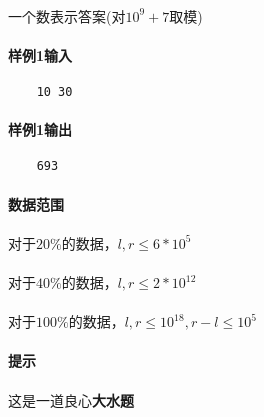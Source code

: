 \documentclass[UTF8]{ctexart}
\begin{document}
\paragraph{}一个数表示答案(对$10^9+7$取模)
\paragraph{样例1输入}
\begin{lstlisting}
    10 30
\end{lstlisting}
\paragraph{样例1输出}
\begin{lstlisting}
    693
\end{lstlisting}
\paragraph{数据范围}
\paragraph{}对于$20\%$的数据，$l,r\leq 6*10^5$
\paragraph{}对于$40\%$的数据，$l,r\leq 2*10^{12}$
\paragraph{}对于$100\%$的数据，$l,r\leq 10^{18},r-l\leq10^5$
\paragraph{提示}
\paragraph{}这是一道良心\textbf{大水题}
\end{document}
